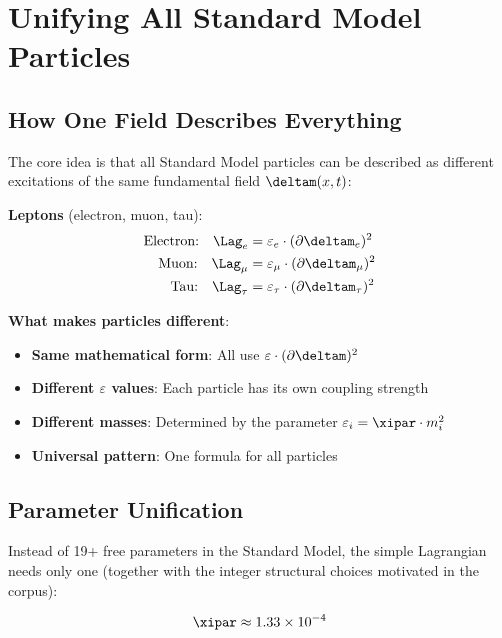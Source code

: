 	\section{Unifying All Standard Model Particles}
	
	\subsection{How One Field Describes Everything}
	
	The core idea is that all Standard Model particles can be described as different excitations of the same fundamental field $\deltam(x,t)$:
	
	\textbf{Leptons} (electron, muon, tau):
	\begin{align}
		\text{Electron:} \quad \Lag_e &= \varepsilon_e \cdot (\partial \deltam_e)^2 \\
		\text{Muon:} \quad \Lag_{\mu} &= \varepsilon_{\mu} \cdot (\partial \deltam_{\mu})^2 \\
		\text{Tau:} \quad \Lag_{\tau} &= \varepsilon_{\tau} \cdot (\partial \deltam_{\tau})^2
	\end{align}
	
	\textbf{What makes particles different}:
	\begin{itemize}
		\item \textbf{Same mathematical form}: All use $\varepsilon \cdot (\partial \deltam)^2$
		\item \textbf{Different $\varepsilon$ values}: Each particle has its own coupling strength
		\item \textbf{Different masses}: Determined by the parameter $\varepsilon_i = \xipar \cdot m_i^2$
		\item \textbf{Universal pattern}: One formula for all particles
	\end{itemize}
	
	\subsection{Parameter Unification}
	
	Instead of 19+ free parameters in the Standard Model, the simple Lagrangian needs only one (together with the integer structural choices motivated in the corpus):
	
	\begin{equation}
		\xipar \approx 1.33 \times 10^{-4}
		\label{eq:universal_parameter}
	\end{equation}
	
